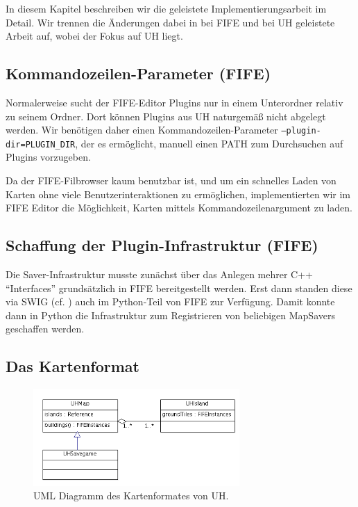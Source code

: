 In diesem Kapitel beschreiben wir die geleistete Implementierungsarbeit im
Detail. Wir trennen die Änderungen dabei in bei FIFE und bei UH geleistete
Arbeit auf, wobei der Fokus auf UH liegt. 


\subsection{Kommandozeilen-Parameter (FIFE)}
Normalerweise sucht der FIFE-Editor Plugins nur in einem Unterordner relativ zu
seinem Ordner. Dort können Plugins aus UH naturgemäß nicht abgelegt werden. Wir
benötigen daher einen Kommandozeilen-Parameter {\tt --plugin-dir=PLUGIN\_DIR},
der es ermöglicht, manuell einen PATH zum Durchsuchen auf Plugins vorzugeben. 

Da der FIFE-Filbrowser kaum benutzbar ist, und um ein schnelles Laden von Karten
ohne viele Benutzerinteraktionen zu ermöglichen, implementierten wir im FIFE
Editor die Möglichkeit, Karten mittels Kommandozeilenargument zu laden. 



\subsection{Schaffung der Plugin-Infrastruktur (FIFE)}
Die Saver-Infrastruktur musste zunächst über das Anlegen mehrer C++
``Interfaces'' grundsätzlich in FIFE bereitgestellt werden. Erst dann standen
diese via SWIG (cf.
\cite{swig}) auch im Python-Teil von FIFE zur Verfügung. Damit konnte dann in
Python die Infrastruktur zum Registrieren von beliebigen MapSavers geschaffen
werden.

\subsection{Das Kartenformat}
\label{kartenformat}

%
%
\begin{figure}[htbp]
  \centering

    \includegraphics[width=0.7\textwidth]{gfx/klassendiagramm-UHSaveGame.png}

  \caption{UML Diagramm des Kartenformates von UH.}
  \label{figure:automaton-intersection}
\end{figure}

